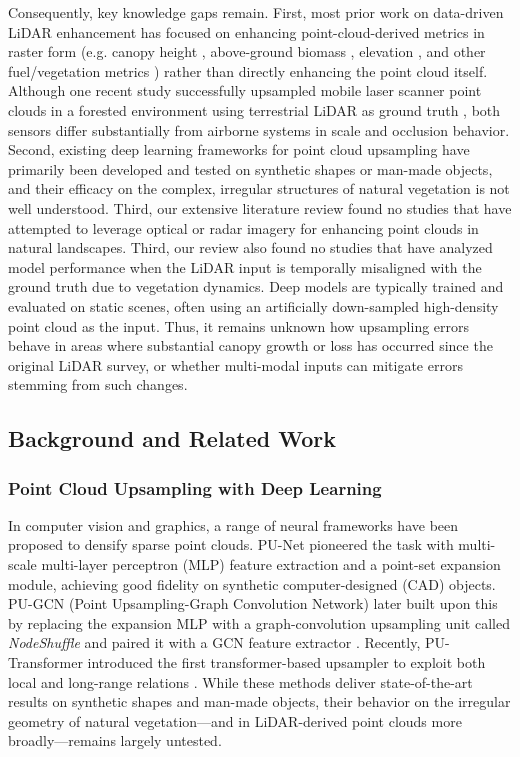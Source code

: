 \documentclass[preprint,12pt,authoryear]{elsarticle}
\begin{document}
Consequently, key knowledge gaps remain. First, most prior work on data-driven LiDAR enhancement has focused on enhancing point-cloud-derived metrics in raster form (e.g. canopy height \citep{wilkes_mapping_2015, wagner_sub-meter_2024}, above-ground biomass \citep{shendryk2022fusing}, elevation \citep{li2023large}, and other fuel/vegetation metrics \citep{taneja2023up, gazzea2023high}) rather than directly enhancing the point cloud itself. Although one recent study successfully upsampled mobile laser scanner point clouds in a forested environment using terrestrial LiDAR as ground truth \citep{remijnse2024upsampling}, both sensors differ substantially from airborne systems in scale and occlusion behavior. Second, existing deep learning frameworks for point cloud upsampling have primarily been developed and tested on synthetic shapes or man-made objects, and their efficacy on the complex, irregular structures of natural vegetation is not well understood. Third, our extensive literature review found no studies that have attempted to leverage optical or radar imagery for enhancing point clouds in natural landscapes. Third, our review also found no studies that have analyzed model performance when the LiDAR input is temporally misaligned with the ground truth due to vegetation dynamics. Deep models are typically trained and evaluated on static scenes, often using an artificially down-sampled high-density point cloud as the input. Thus, it remains unknown how upsampling errors behave in areas where substantial canopy growth or loss has occurred since the original LiDAR survey, or whether multi-modal inputs can mitigate errors stemming from such changes.

\subsection{Background and Related Work}

\subsubsection{Point Cloud Upsampling with Deep Learning}

In computer vision and graphics, a range of neural frameworks have been proposed to densify sparse point clouds. PU-Net \citep{yu2018pu} pioneered the task with multi-scale multi-layer perceptron (MLP) feature extraction and a point-set expansion module, achieving good fidelity on synthetic computer-designed (CAD) objects. PU-GCN (Point Upsampling-Graph Convolution Network) later built upon this by replacing the expansion MLP with a graph-convolution upsampling unit called \emph{NodeShuffle} and paired it with a GCN feature extractor \citep{qian2021pu}. Recently, PU-Transformer introduced the first transformer-based upsampler to exploit both local and long-range relations \citep{qiu2022pu}. While these methods deliver state-of-the-art results on synthetic shapes and man-made objects, their behavior on the irregular geometry of natural vegetation—and in LiDAR-derived point clouds more broadly—remains largely untested.
\end{document}
